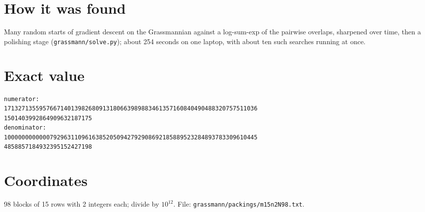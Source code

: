 \documentclass[11pt,a4paper]{article}
\begin{document}
\section{How it was found}
Many random starts of gradient descent on the Grassmannian against a log-sum-exp of the pairwise overlaps, sharpened over time, then a polishing stage (\texttt{grassmann/solve.py}); about 254 seconds on one laptop, with about ten such searches running at once.


\appendix
\section{Exact value}
{\small
\begin{verbatim}
numerator:
171327135595766714013982680913180663989883461357160840490488320757511036
1501403992864909632187175
denominator:
100000000000079296311096163852050942792908692185889523284893783309610445
4858857184932395152427198
\end{verbatim}}

\section{Coordinates}
98 blocks of 15 rows with 2 integers each; divide by $10^{12}$. File: \texttt{grassmann/packings/m15n2N98.txt}.
{\tiny
\begin{multicols}{4}
\end{multicols}}
\end{document}
